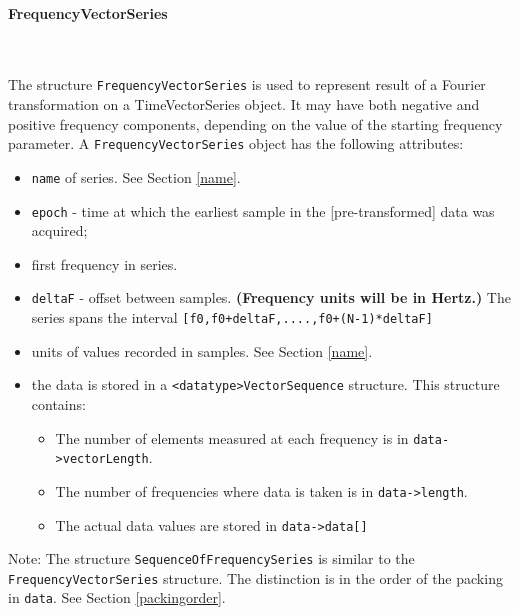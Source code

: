\documentclass[]{ligodcc}
\renewcommand{\texttt}[1]{{\ttfamily\color{blue}#1}}
\begin{document}
\paragraph{{\texttt {FrequencyVectorSeries}} }~



The structure {\tt FrequencyVectorSeries} is used to represent result of a
Fourier transformation on a TimeVectorSeries object. It may have both
negative and positive frequency components, depending on the value
of the starting frequency parameter. A {\tt FrequencyVectorSeries} object
has the following attributes:


\begin{itemize}
\vspace{-0.15in}
\item
{\tt name} of series. See Section \ref{name}.
\vspace{-0.15in}
\item
{\tt epoch}  -  time at which the earliest sample in the [pre-transformed]
data was acquired;
\vspace{-0.15in}
\item
first frequency in series. 
\vspace{-0.15in}
\item
{\tt deltaF}  -  offset between samples.  {\bf (Frequency units will be in Hertz.)}
The series spans the interval {\tt [f0,f0+deltaF,....,f0+(N-1)*deltaF]}
\vspace{-0.15in}
\item
units of values recorded in samples. See Section \ref{name}.
\vspace{-0.15in}
\item
the data is stored in a {\tt <datatype>VectorSequence}  
structure. This structure contains:
\begin{itemize}
\vspace{-0.10in}
\item
The number of elements measured at each frequency is in {\tt data->vectorLength}.
\vspace{-0.10in}
\item
The number of frequencies where  data is taken is in {\tt data->length}.
\vspace{-0.10in}
\item
The actual data  values are stored in {\tt data->data[]}
\end{itemize}
\end{itemize}

Note: The structure {\tt SequenceOfFrequencySeries} is similar to the
{\tt FrequencyVectorSeries} structure. The distinction is in the order of
the packing in {\tt *data}. See Section \ref{packingorder}.
\end{document}

